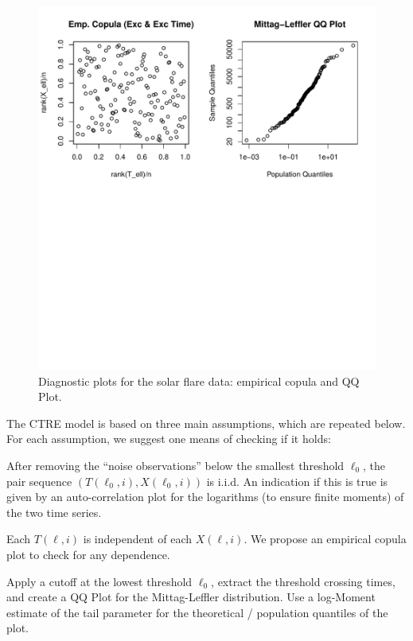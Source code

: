 \documentclass[smallextended]{svjour3}       %
\providecommand{\tightlist}{%
  \setlength{\itemsep}{0pt}\setlength{\parskip}{0pt}}
\begin{document}
\begin{figure}
\includegraphics[width=\textwidth]{article_springer_files/figure-latex/flare-diagnostics-2-1} \caption{Diagnostic plots for the solar flare data: empirical copula and QQ Plot. \label{fig:flare-diagnostics-2}}\label{fig:flare-diagnostics-2}
\end{figure}

The CTRE model is based on three main assumptions, which are repeated
below. For each assumption, we suggest one means of checking if it
holds:

\begin{description}
\tightlist
\item[i.i.d.:]
After removing the ``noise observations'' below the smallest threshold
\(\ell_0\), the pair sequence \((T(\ell_0, i), X(\ell_0,i))\) is i.i.d.
An indication if this is true is given by an auto-correlation plot for
the logarithms (to ensure finite moments) of the two time series.
\item[Uncoupled:]
Each \(T(\ell, i)\) is independent of each \(X(\ell, i)\). We propose an
empirical copula plot to check for any dependence.
\item[\({\rm ML}(\beta, \sigma)\) distribution of \(T(\ell, i)\):]
Apply a cutoff at the lowest threshold \(\ell_0\), extract the threshold
crossing times, and create a QQ Plot for the Mittag-Leffler
distribution. Use a log-Moment estimate of the tail parameter for the
theoretical / population quantiles of the plot.
\end{description}
\end{document}
